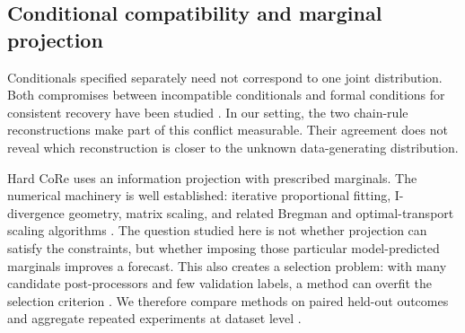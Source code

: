 \documentclass[a4paper,fleqn]{cas-sc}
\begin{document}
\subsection{Conditional compatibility and marginal projection}
Conditionals specified separately need not correspond to one joint distribution. Both compromises between incompatible conditionals and formal conditions for consistent recovery have been studied \citep{mure2019compromise,majid2025consistent}. In our setting, the two chain-rule reconstructions make part of this conflict measurable. Their agreement does not reveal which reconstruction is closer to the unknown data-generating distribution.

Hard CoRe uses an information projection with prescribed marginals. The numerical machinery is well established: iterative proportional fitting, I-divergence geometry, matrix scaling, and related Bregman and optimal-transport scaling algorithms \citep{deming1940ipf,csiszar1975idiv,sinkhorn1964scaling,cuturi2013sinkhorn,benamou2015bregman,chizat2018scaling}. The question studied here is not whether projection can satisfy the constraints, but whether imposing those particular model-predicted marginals improves a forecast. This also creates a selection problem: with many candidate post-processors and few validation labels, a method can overfit the selection criterion \citep{cawley2010overfitting}. We therefore compare methods on paired held-out outcomes and aggregate repeated experiments at dataset level \citep{demsar2006comparisons}.

\begin{table}
\centering
\caption{Relation to adjacent methods. ``Outcome-gated'' means that held-out labels may determine whether a transformation is applied. These categories summarize typical uses and are not claims that every published variant has identical properties.}
\label{tab:positioning}
\end{table}
\end{document}
